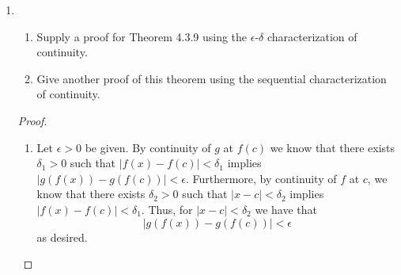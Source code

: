 \begin{enumerate}
\begin{proof}
\begin{enumerate}
        \item Let \( c \neq 0 \) and let \( \epsilon > 0 \) be given. We observe that
        \[
        x- c = (x^{\frac{1}{3}}-c^{\frac{1}{3}})(x^{\frac{2}{3}}+x^{\frac{1}{3}}c^{\frac{1}{3}}+c^{\frac{2}{3}})
        \]
        If we let \( y = x^{\frac{1}{3}} \) then we get that
        \[
        x^{\frac{2}{3}}+c^{\frac{1}{3}}x^{\frac{1}{3}}+c^{\frac{2}{3}} = y^{2}+c^{\frac{1}{3}}y+c^{\frac{2}{3}}
        \]
        which means that this expression is quadratic in \( y \). Furthermore, one can easily verify, using the quadratic formula, that since \( c \neq 0 \) it follows that \( c \) is not a root of \( y^{2}+c^{\frac{1}{3}}y+c^{\frac{2}{3}} \). Thus, since \( x^{\frac{1}{3}} \) is continuous at \( 0 \) it follows that there exists \( \delta > 0 \) and \( M_{2} > M_{1} > 0 \) such that whenever \( \vert x - c \vert < \delta_{1} \) we will have that
        \[
        M_{1} < \vert x^{\frac{2}{3}}+c^{\frac{1}{3}}x^{\frac{1}{3}}+c^{\frac{2}{3}} \vert < M_{2}
        \]
        Notice this implies that \( \frac{M_{1}}{\vert x^{\frac{2}{3}}+c^{\frac{1}{3}}x^{\frac{1}{3}}+c^{\frac{2}{3}} \vert} < 1 \) for \( x \) close enough to \( c \). So, if \( \delta = \min \{ d_{1}, \epsilon M_{1} \} \) then it follows that whenever \( \vert x-c \vert < \delta \) we get
        \[
        \vert x^{\frac{1}{3}} - c^{\frac{1}{3}} \vert = \frac{\vert x-c \vert}{ \vert x^{\frac{2}{3}}+c^{\frac{1}{3}}x^{\frac{1}{3}}+c^{\frac{2}{3}} \vert } < \frac{\epsilon M_{1}}{\vert x^{\frac{2}{3}}+c^{\frac{1}{3}}x^{\frac{1}{3}}+c^{\frac{2}{3}} \vert} < \epsilon
        \]
        which was to be demonstrated.
    \end{enumerate}
    \end{proof}
    
    \item \begin{enumerate}
        \item Supply a proof for Theorem 4.3.9 using the \( \epsilon \)-\(\delta \) characterization of continuity.
        
        \item Give another proof of this theorem using the sequential characterization of continuity.
    \end{enumerate}
    
    \begin{proof}
    \begin{enumerate}
        \item Let \( \epsilon > 0 \) be given. By continuity of \( g \) at \( f(c) \) we know that there exists \( \delta_{1} > 0 \) such that \( \vert f(x) - f(c) \vert < \delta_{1} \) implies \linebreak \( \vert g(f(x)) - g(f(c)) \vert < \epsilon \). Furthermore, by continuity of \( f \) at \( c \), we know that there exists \( \delta_{2} > 0 \) such that \( \vert x - c \vert < \delta_{2} \) implies \linebreak \( \vert f(x) - f(c) \vert < \delta_{1} \). Thus, for \( \vert x - c \vert < \delta_{2} \) we have that 
        \[
        \vert g(f(x)) - g(f(c)) \vert < \epsilon
        \]
        as desired.
        

\end{enumerate}
\end{proof}
\end{enumerate}
